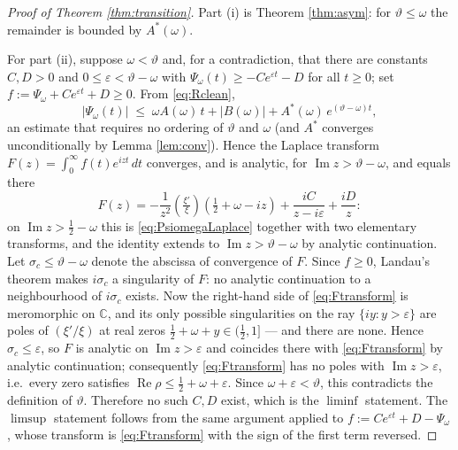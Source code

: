 \documentclass[11pt,reqno]{amsart}
\theoremstyle{plain}
\theoremstyle{definition}
\newcommand{\C}{\mathbb{C}}
\newcommand{\Rp}{\operatorname{Re}}
\newcommand{\Ip}{\operatorname{Im}}
\newcommand{\lxi}[1]{\left(\tfrac{\xi'}{\xi}\right)\!#1}
\begin{document}
\begin{proof}[Proof of Theorem \ref{thm:transition}]
Part (i) is Theorem \ref{thm:asym}: for $\vartheta\le\omega$ the remainder is bounded by
$A^{*}(\omega)$.

For part (ii), suppose $\omega<\vartheta$ and, for a contradiction, that there are constants
$C,D>0$ and $0\le\varepsilon<\vartheta-\omega$ with $\Psi_\omega(t)\ge-Ce^{\varepsilon t}-D$ for
all $t\ge0$; set $f:=\Psi_\omega+Ce^{\varepsilon t}+D\ge0$. From \eqref{eq:Rclean},
\[
  |\Psi_\omega(t)|\;\le\;\omega A(\omega)\,t+|B(\omega)|+A^{*}(\omega)\,e^{(\vartheta-\omega)t},
\]
an estimate that requires no ordering of $\vartheta$ and $\omega$ (and $A^{*}$ converges
unconditionally by Lemma \ref{lem:conv}). Hence the Laplace transform
$F(z)=\int_0^\infty f(t)e^{izt}\,dt$ converges, and is analytic, for $\Ip z>\vartheta-\omega$,
and equals there
\begin{equation}\label{eq:Ftransform}
  F(z)=-\frac{1}{z^{2}}\lxi{\left(\tfrac12+\omega-iz\right)}
  +\frac{iC}{z-i\varepsilon}+\frac{iD}{z}:
\end{equation}
on $\Ip z>\tfrac12-\omega$ this is \eqref{eq:PsiomegaLaplace} together with two elementary
transforms, and the identity extends to $\Ip z>\vartheta-\omega$ by analytic continuation.
Let $\sigma_c\le\vartheta-\omega$ denote the abscissa of convergence of $F$. Since $f\ge0$,
Landau's theorem \cite[Ch.~II, Thm.~5b]{Widder} makes $i\sigma_c$ a singularity of $F$: no
analytic continuation to a neighbourhood of $i\sigma_c$ exists. Now the right-hand side of
\eqref{eq:Ftransform} is meromorphic on $\C$, and its only possible singularities on the ray
$\{iy:y>\varepsilon\}$ are poles of $(\xi'/\xi)$ at real zeros $\tfrac12+\omega+y\in(\tfrac12,1]$
--- and there are none. Hence $\sigma_c\le\varepsilon$, so $F$ is analytic on
$\Ip z>\varepsilon$ and coincides there with \eqref{eq:Ftransform} by analytic continuation;
consequently \eqref{eq:Ftransform} has no poles with $\Ip z>\varepsilon$, i.e.\ every zero
satisfies $\Rp\rho\le\tfrac12+\omega+\varepsilon$. Since $\omega+\varepsilon<\vartheta$, this
contradicts the definition of $\vartheta$. Therefore no such $C,D$ exist, which is the
$\liminf$ statement. The $\limsup$ statement follows from the same argument applied to
$f:=Ce^{\varepsilon t}+D-\Psi_\omega$, whose transform is \eqref{eq:Ftransform} with the sign of
the first term reversed.
\end{proof}
\end{document}
